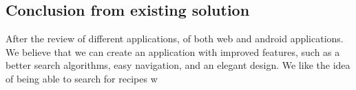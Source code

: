 \subsection*{Conclusion from existing solution}
 After the review of different applications, of both web and android applications. We believe that we can create an application with improved features, such as a better search algorithms, easy navigation, and an elegant design. We like the idea of being able to search for recipes w   

